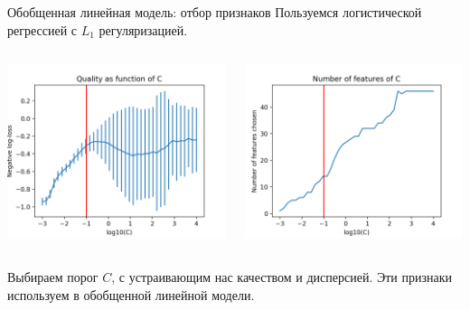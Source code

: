 \documentclass{beamer}
\begin{document}
\begin{frame}{Обобщенная линейная модель: отбор признаков}
    Пользуемся логистической регрессией с $L_1$ регуляризацией.
    \begin{columns}
        \begin{column}{.5\textwidth}
            \begin{center}
                \includegraphics[width=\textwidth]{../pics/lr_quality_C.png}
            \end{center}
        \end{column}
        \begin{column}{.5\textwidth}
            \begin{center}
                \includegraphics[width=\textwidth]{../pics/lr_n_features_C.png}
            \end{center}
        \end{column}
    \end{columns}
    Выбираем порог $C$, с устраивающим нас качеством и дисперсией. Эти признаки
    используем в обобщенной линейной модели.
\end{frame}
\end{document}
